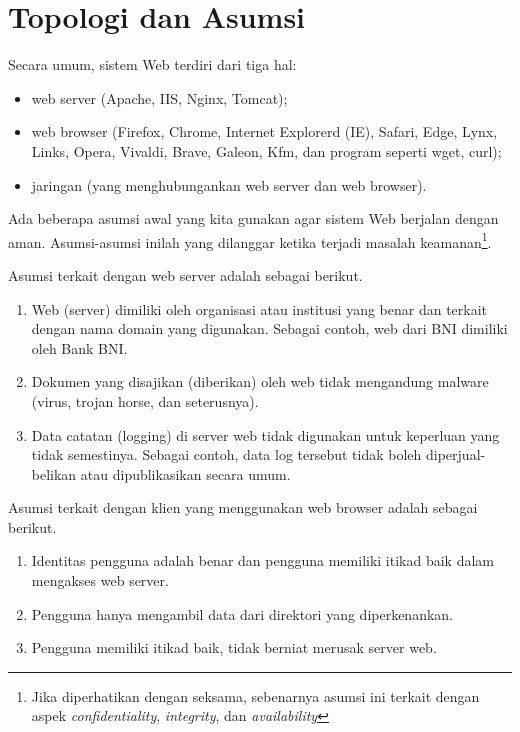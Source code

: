 \section{Topologi dan Asumsi}
Secara umum, sistem Web terdiri dari tiga hal:
\begin{itemize}
   \item web server (Apache, IIS, Nginx, Tomcat);
   \item web browser (Firefox, Chrome, Internet Explorerd (IE), Safari, 
      Edge, Lynx, Links, Opera, Vivaldi, Brave, Galeon, Kfm,
      dan program seperti wget, curl);
   \item jaringan (yang menghubungankan web server dan web browser).
\end{itemize}

Ada beberapa asumsi awal yang kita gunakan agar sistem Web berjalan
dengan aman. Asumsi-asumsi inilah yang dilanggar ketika terjadi masalah
keamanan\footnote{Jika diperhatikan dengan seksama, sebenarnya asumsi ini
terkait dengan aspek {\em confidentiality}, {\em integrity}, dan {\em
availability}}.

Asumsi terkait dengan web server adalah sebagai berikut.

\begin{enumerate}
\item Web (server) dimiliki oleh organisasi atau institusi yang benar dan
terkait dengan nama domain yang digunakan. Sebagai contoh, web dari BNI
dimiliki oleh Bank BNI.
\item Dokumen yang disajikan (diberikan) oleh web tidak mengandung malware
(virus, trojan horse, dan seterusnya).
\item Data catatan (logging) di server web tidak digunakan untuk keperluan yang
tidak semestinya. Sebagai contoh, data log tersebut tidak boleh
diperjual-belikan atau dipublikasikan secara umum.
\end{enumerate}

Asumsi terkait dengan klien yang menggunakan web browser adalah sebagai
berikut.
\begin{enumerate}
   \item Identitas pengguna adalah benar dan pengguna memiliki itikad baik
      dalam mengakses web server.
   \item Pengguna hanya mengambil data dari direktori yang diperkenankan.
   \item Pengguna memiliki itikad baik, tidak berniat merusak server web.
\end{enumerate}

